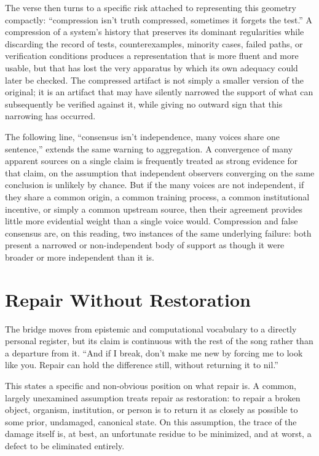 \documentclass[11pt]{article}
\begin{document}
The verse then turns to a specific risk attached to representing this geometry compactly: ``compression isn't truth compressed, sometimes it forgets the test.'' A compression of a system's history that preserves its dominant regularities while discarding the record of tests, counterexamples, minority cases, failed paths, or verification conditions produces a representation that is more fluent and more usable, but that has lost the very apparatus by which its own adequacy could later be checked. The compressed artifact is not simply a smaller version of the original; it is an artifact that may have silently narrowed the support of what can subsequently be verified against it, while giving no outward sign that this narrowing has occurred.

The following line, ``consensus isn't independence, many voices share one sentence,'' extends the same warning to aggregation. A convergence of many apparent sources on a single claim is frequently treated as strong evidence for that claim, on the assumption that independent observers converging on the same conclusion is unlikely by chance. But if the many voices are not independent, if they share a common origin, a common training process, a common institutional incentive, or simply a common upstream source, then their agreement provides little more evidential weight than a single voice would. Compression and false consensus are, on this reading, two instances of the same underlying failure: both present a narrowed or non-independent body of support as though it were broader or more independent than it is.

\section{Repair Without Restoration}

The bridge moves from epistemic and computational vocabulary to a directly personal register, but its claim is continuous with the rest of the song rather than a departure from it. ``And if I break, don't make me new by forcing me to look like you. Repair can hold the difference still, without returning it to nil.''

This states a specific and non-obvious position on what repair is. A common, largely unexamined assumption treats repair as restoration: to repair a broken object, organism, institution, or person is to return it as closely as possible to some prior, undamaged, canonical state. On this assumption, the trace of the damage itself is, at best, an unfortunate residue to be minimized, and at worst, a defect to be eliminated entirely.
\end{document}
